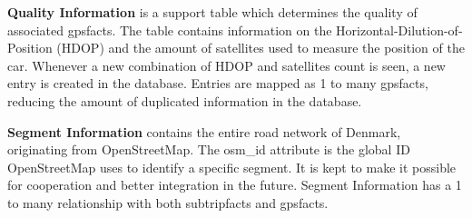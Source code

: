 \textbf{Quality Information} is a support table which determines the quality of associated gpsfacts. The table contains information on the Horizontal-Dilution-of-Position (HDOP) and the amount of satellites used to measure the position of the car. Whenever a new combination of HDOP and satellites count is seen, a new entry is created in the database. Entries are mapped as 1 to many gpsfacts, reducing the amount of duplicated information in the database.

\textbf{Segment Information} contains the entire road network of Denmark, originating from OpenStreetMap. The osm\_id  attribute is the global ID OpenStreetMap uses to identify a specific segment. It is kept to make it possible for cooperation and better integration in the future. Segment Information has a 1 to many relationship with both subtripfacts and gpsfacts.